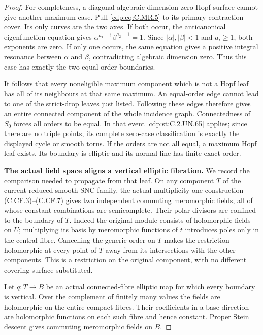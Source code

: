 \begin{proof}
For completeness, a diagonal algebraic-dimension-zero
Hopf surface cannot give another maximum case. Pull
\eqref{cdp:eq:C.MR.5} to its primary contraction cover. Its only
curves are the two axes. If both occur, the
anticanonical eigenfunction equation gives
$\alpha^{a_1-1}\beta^{a_2-1}=1$.
Since $|\alpha|,|\beta|<1$ and $a_i\ge1$, both
exponents are zero. If only one occurs, the same
equation gives a positive integral resonance
between $\alpha$ and $\beta$, contradicting
algebraic dimension zero. Thus this case has
exactly the two equal-order boundaries.

It follows that every noneligible maximum component
which is not a Hopf leaf has all of its neighbours
at that same maximum. An equal-order edge cannot
lead to one of the strict-drop leaves just listed.
Following these edges therefore gives an entire
connected component of the whole incidence graph.
Connectedness of $S_0$ forces all orders to be equal.
In that event \ref{cdp:st:C.2.UN.65} applies; since there are no triple
points, its complete zero-case classification is
exactly the displayed cycle or smooth torus.
If the orders are not all equal, a maximum Hopf
leaf exists. Its boundary is elliptic and its normal
line has finite exact order.

\par\medskip\noindent\textbf{The actual field space aligns a vertical elliptic fibration.}
We record the comparison needed to propagate from that
leaf. On any component $T$ of the current reduced smooth
SNC family, the actual multiplicity-one construction
(C.CF.3)--(C.CF.7) gives two independent commuting
meromorphic fields, all of whose constant combinations
are semicomplete. Their polar divisors are confined to
the boundary of $T$. Indeed the original module consists
of holomorphic fields on $U$; multiplying its basis by
meromorphic functions of $t$ introduces poles only in
the central fibre. Cancelling the generic order on
$T$ makes the restriction holomorphic at every point
of $T$ away from its intersections with the other
components. This is a restriction on the original
component, with no different covering surface substituted.

Let $q:T\to B$ be an actual connected-fibre elliptic
map for which every boundary is vertical. Over the
complement of finitely many values the fields are
holomorphic on the entire compact fibres. Their
coefficients in a base direction are holomorphic
functions on each such fibre and hence constant.
Proper Stein descent gives commuting meromorphic
fields on $B$.


\end{proof}
